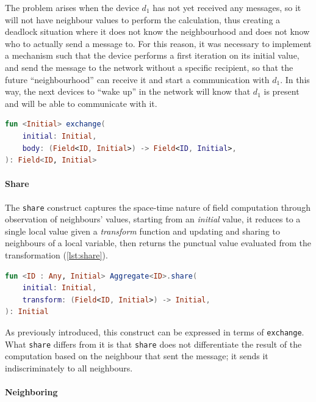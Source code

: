 The problem arises when the device $d_1$ has not yet received any messages, so it will not have neighbour values to perform
the calculation, thus creating a deadlock situation where it does not know the neighbourhood and does not know who to actually send a message to.
For this reason, it was necessary to implement a mechanism such that the device performs a first iteration on its initial value,
and send the message to the network without a specific recipient, so that the future ``neighbourhood'' can receive it and start a communication with $d_1$.
In this way, the next devices to ``wake up'' in the network will know that $d_1$ is present and will be able to communicate with it.

\begin{lstlisting}[language=kt,label={lst:exchange}, caption={The signature of the \texttt{exchange} function.}]
fun <Initial> exchange(
    initial: Initial,
    body: (Field<ID, Initial>) -> Field<ID, Initial>,
): Field<ID, Initial>
\end{lstlisting}

\paragraph{Share}
The \texttt{share} construct captures the space-time nature of field computation through observation of neighbours' values,
starting from an \emph{initial} value, it reduces to a single local value given a \emph{transform} function and updating and sharing to
neighbours of a local variable, then returns the punctual value evaluated from the transformation (\ref{lst:share}).

\begin{lstlisting}[language=kt,label={lst:share}, caption={The signature of the \texttt{share} function.}]
fun <ID : Any, Initial> Aggregate<ID>.share(
    initial: Initial,
    transform: (Field<ID, Initial>) -> Initial,
): Initial
\end{lstlisting}

As previously introduced, this construct can be expressed in terms of \texttt{exchange}.
What \texttt{share} differs from it is that \texttt{share} does not differentiate the result of the computation based on
the neighbour that sent the message; it sends it indiscriminately to all neighbours.

\paragraph{Neighboring}

